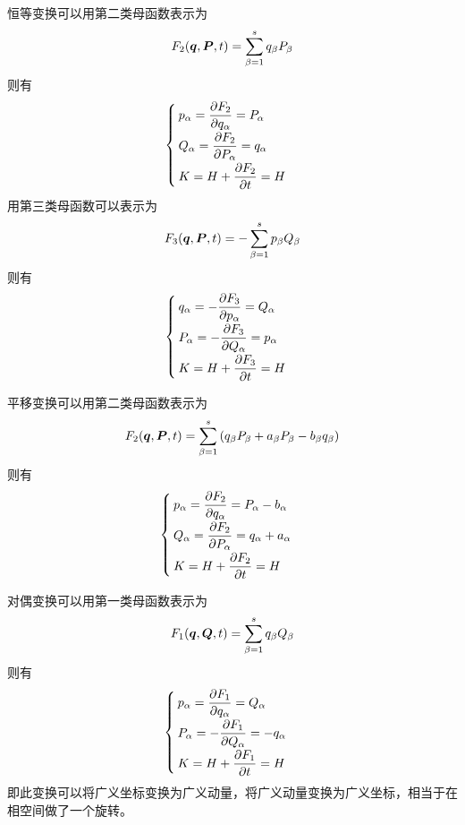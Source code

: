 \begin{example}[恒等变换]
恒等变换可以用第二类母函数表示为
\begin{equation*}
	F_2(\boldsymbol{q},\boldsymbol{P},t) = \sum_{\beta=1}^s q_\beta P_\beta
\end{equation*}
则有
\begin{equation*}
	\begin{cases}
		p_\alpha = \dfrac{\partial F_2}{\partial q_\alpha} = P_\alpha \\[1.5ex]
		Q_\alpha = \dfrac{\partial F_2}{\partial P_\alpha} = q_\alpha \\[1.5ex]
		K = H + \dfrac{\partial F_2}{\partial t} = H
	\end{cases}
\end{equation*}
用第三类母函数可以表示为
\begin{equation*}
	F_3(\boldsymbol{q},\boldsymbol{P},t) = -\sum_{\beta=1}^s p_\beta Q_\beta
\end{equation*}
则有
\begin{equation*}
	\begin{cases}
		q_\alpha = -\dfrac{\partial F_3}{\partial p_\alpha} = Q_\alpha \\[1.5ex]
		P_\alpha = -\dfrac{\partial F_3}{\partial Q_\alpha} = p_\alpha \\[1.5ex]
		K = H + \dfrac{\partial F_3}{\partial t} = H
	\end{cases}
\end{equation*}
\end{example}

\begin{example}[平移变换]
平移变换可以用第二类母函数表示为
\begin{equation*}
	F_2(\boldsymbol{q},\boldsymbol{P},t) = \sum_{\beta=1}^s \left(q_\beta P_\beta + a_\beta P_\beta - b_\beta q_\beta\right)
\end{equation*}
则有
\begin{equation*}
	\begin{cases}
		p_\alpha = \dfrac{\partial F_2}{\partial q_\alpha} = P_\alpha-b_\alpha \\[1.5ex]
		Q_\alpha = \dfrac{\partial F_2}{\partial P_\alpha} = q_\alpha+a_\alpha \\[1.5ex]
		K = H + \dfrac{\partial F_2}{\partial t} = H
	\end{cases}
\end{equation*}
\end{example}

\begin{example}[对偶变换]
对偶变换可以用第一类母函数表示为
\begin{equation*}
	F_1(\boldsymbol{q},\boldsymbol{Q},t) = \sum_{\beta=1}^s q_\beta Q_\beta
\end{equation*}
则有
\begin{equation*}
	\begin{cases}
		p_\alpha = \dfrac{\partial F_1}{\partial q_\alpha} = Q_\alpha \\[1.5ex]
		P_\alpha = -\dfrac{\partial F_1}{\partial Q_\alpha} = -q_\alpha \\[1.5ex]
		K = H + \dfrac{\partial F_1}{\partial t} = H
	\end{cases}
\end{equation*}
即此变换可以将广义坐标变换为广义动量，将广义动量变换为广义坐标，相当于在相空间做了一个旋转。
\end{example}

